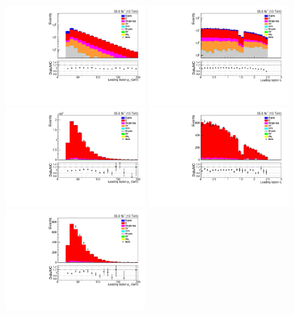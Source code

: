 \begin{figure}[h]
\centering
\includegraphics[width=0.47\textwidth]{figs/background-estimation/plots/unblinded/ttbar_control/lep1Pt_SingleTop_lepSel_emu_log.pdf}
\includegraphics[width=0.47\textwidth]{figs/background-estimation/plots/unblinded/ttbar_control/lep1Eta_SingleTop_lepSel_emu_log.pdf}
\\
\includegraphics[width=0.47\textwidth]{figs/background-estimation/plots/unblinded/ttbar_control/lep1Pt_SingleTop_jetSel_emu.pdf}
\includegraphics[width=0.47\textwidth]{figs/background-estimation/plots/unblinded/ttbar_control/lep1Eta_SingleTop_jetSel_emu.pdf}
\\
\includegraphics[width=0.47\textwidth]{figs/background-estimation/plots/unblinded/ttbar_control/lep1Pt_SingleTop_wMass_emu.pdf}

\end{figure}
